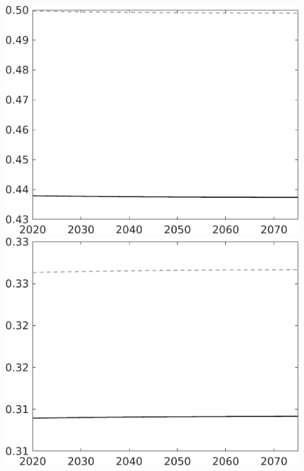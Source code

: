 \documentclass[12pt]{article}
\begin{document}
\begin{figure}[h!!]
\begin{minipage}[]{0.32\textwidth}
	\end{minipage}	
	\begin{minipage}[]{0.32\textwidth}
		\includegraphics[width=1\textwidth]{../../codding_model/own_basedOnFried/optimalPol_010922_revision/figures/all_13Sept22/CompTaul_Equlab_LFBAU_Reg0_hh_spillover0_nsk0_xgr0_knspil1_sep1_countec0_GovRev0_etaa0.79_lgd0.png}
	\end{minipage}	
\begin{minipage}[]{0.32\textwidth}
\includegraphics[width=1\textwidth]{../../codding_model/own_basedOnFried/optimalPol_010922_revision/figures/all_13Sept22/CompTaul_Equlab_LFBAU_Reg0_hl_spillover0_nsk0_xgr0_knspil1_sep1_countec0_GovRev0_etaa0.79_lgd0.png}

\end{minipage}
\end{figure}
\end{document}
